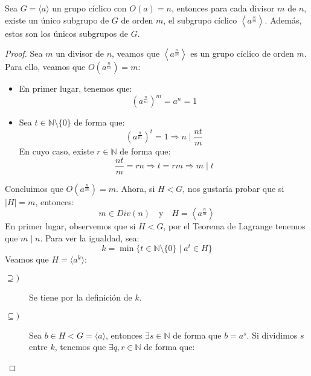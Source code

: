 \begin{prop}
    Sea $G=\langle a \rangle $ un grupo cíclico con $O(a) = n$, entonces para cada divisor $m$ de $n$, existe un único subgrupo de $G$ de orden $m$, el subgrupo cíclico $\left\langle a^{\frac{n}{m}} \right\rangle$.
    Además, estos son los únicos subgrupos de $G$. %
    \begin{proof}
        Sea $m$ un divisor de $n$, veamos que $\left\langle a^{\frac{n}{m}} \right\rangle $ es un grupo cíclico de orden $m$. Para ello, veamos que $O\left(a^{\frac{n}{m}}\right) = m$:
        \begin{itemize}
            \item En primer lugar, tenemos que:
                \begin{equation*}
                    {(a^{\frac{n}{m}})}^{m} = a^n = 1
                \end{equation*}
            \item Sea $t\in \mathbb{N}\setminus\{0\}$ de forma que:
                \begin{equation*}
                    {(a^{\frac{n}{m}})}^{t} = 1 \Longrightarrow n \mid \dfrac{nt}{m}
                \end{equation*}
                En cuyo caso, existe $r\in \mathbb{N}$ de forma que:
                \begin{equation*}
                    \dfrac{nt}{m} = rn \Longrightarrow t = rm \Longrightarrow m \mid t
                \end{equation*}
        \end{itemize}
        Concluimos que $O(a^{\frac{n}{m}}) = m$. Ahora, si $H<G$, nos gustaría probar que si $|H| = m$, entonces:
        \begin{equation*}
            m\in Div(n) \quad \text{y} \quad H = \left\langle a^{\frac{n}{m}} \right\rangle 
        \end{equation*}
        En primer lugar, observemos que si $H<G$, por el Teorema de Lagrange tenemos que $m\mid n$. Para ver la igualdad, sea:
        \begin{equation*}
            k = \min\{t\in \mathbb{N}\setminus\{0\}\mid a^t \in H\}
        \end{equation*}
        Veamos que $H = \langle a^k \rangle $:
        \begin{description}
            \item [$\supseteq)$] Se tiene por la definición de $k$.
            \item [$\subseteq)$] Sea $b\in H < G = \langle a \rangle $, entonces $\exists s\in \mathbb{N}$ de forma que $b = a^s$. Si dividimos $s$ entre $k$, tenemos que $\exists q,r\in \mathbb{N}$ de forma que:

\end{description}
\end{proof}
\end{prop}
